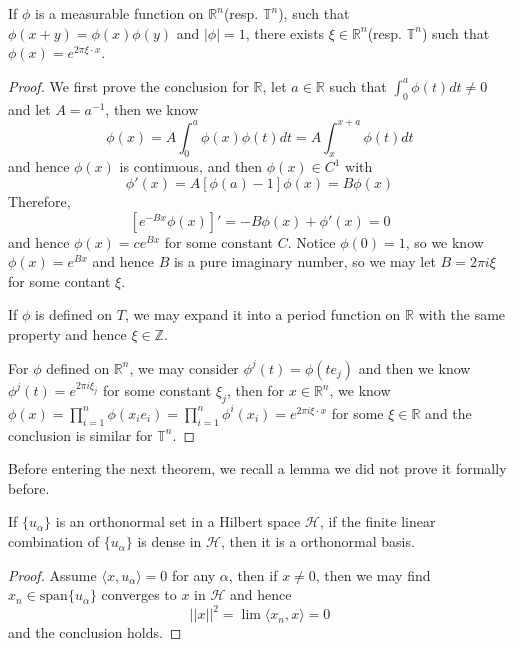 \documentclass[lang=en, color=blue, ]{elegantbook}
\newcommand{\R}{\mathbb{R}}
\newcommand{\T}{\mathbb{T}}
\begin{document}
\begin{theorem}
    If $\phi$ is a measurable function on $\R^n$(resp. $\T^n$), such that $\phi(x+y) = \phi(x)\phi(y)$ and $|\phi|=1$, there exists $\xi\in\R^n$(resp. $\T^n$) such that $\phi(x) = e^{2\pi\xi\cdot x}$.
\end{theorem}
\begin{proof}\par
    We first prove the conclusion for $\R$, let $a\in \R$ such that $\int_0^a \phi(t)dt\neq 0$ and let $A = a^{-1}$, then we know
    \[
    \phi(x) = A\int_0^a \phi(x)\phi(t)dt = A\int_x^{x+a}\phi(t)dt
    \]
    and hence $\phi(x)$ is continuous, and then $\phi(x)\in C^1$ with
    \[
    \phi'(x) = A[\phi(a)-1]\phi(x) = B\phi(x)
    \]
    Therefore,
    \[
    [e^{-Bx}\phi(x)]' = -B\phi(x)+\phi'(x) = 0 
    \]
    and hence $\phi(x) = ce^{Bx}$ for some constant $C$. Notice $\phi(0)= 1$, so we know $\phi(x) =e^{Bx}$ and hence $B$ is a pure imaginary number, so we may let $B = 2\pi i \xi$ for some contant $\xi$.\par
    If $\phi$ is defined on $T$, we may expand it into a period function on $\R$ with the same property and hence $\xi\in \mathbb{Z}$.\par
    For $\phi$ defined on $\R^n$, we may consider $\phi^j(t) = \phi(te_j)$ and then we know $\phi^j(t) = e^{2\pi i \xi_j}$ for some constant $\xi_j$, then for $x\in\R^n$, we know $\phi(x) = \prod_{i=1}^n \phi(x_i e_i) = \prod_{i=1}^n \phi^i(x_i)= e^{2\pi i \xi\cdot x}$ for some $\xi \in \R$ and the conclusion is similar for $\T^n$. 
\end{proof}

Before entering the next theorem, we recall a lemma we did not prove it formally before.

\begin{lemma}
    If $\{u_{\alpha}\}$ is an orthonormal set in a Hilbert space $\mathcal{H}$, if the finite linear combination of $\{u_{\alpha}\}$ is dense in $\mathcal{H}$, then it is a orthonormal basis.
\end{lemma}
\begin{proof}
    Assume $\langle x,u_{\alpha}\rangle = 0$ for any $\alpha$, then if $x\neq 0$, then we may find $x_n \in \text{span}\{u_{\alpha}\}$ converges to $x$ in $\mathcal{H}$ and hence
    \[
    ||x||^2 = \lim\langle x_n,x\rangle =0
    \] 
    and the conclusion holds.
\end{proof}
\end{document}
